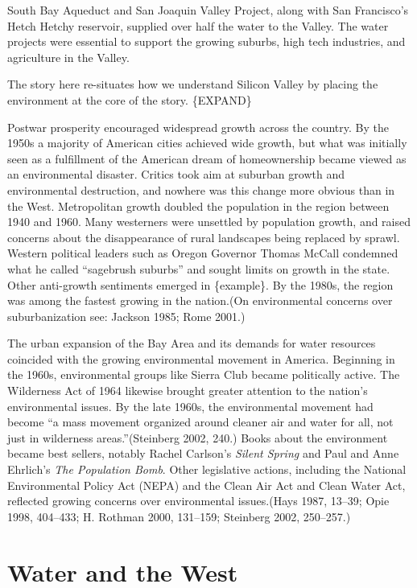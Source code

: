 \documentclass[11pt,article,oneside]{memoir}
\begin{document}
South Bay Aqueduct and San Joaquin Valley Project, along with San
Francisco's Hetch Hetchy reservoir, supplied over half the water to the
Valley. The water projects were essential to support the growing
suburbs, high tech industries, and agriculture in the Valley.

The story here re-situates how we understand Silicon Valley by placing
the environment at the core of the story. \{EXPAND\}

Postwar prosperity encouraged widespread growth across the country. By
the 1950s a majority of American cities achieved wide growth, but what
was initially seen as a fulfillment of the American dream of
homeownership became viewed as an environmental disaster. Critics took
aim at suburban growth and environmental destruction, and nowhere was
this change more obvious than in the West. Metropolitan growth doubled
the population in the region between 1940 and 1960. Many westerners were
unsettled by population growth, and raised concerns about the
disappearance of rural landscapes being replaced by sprawl. Western
political leaders such as Oregon Governor Thomas McCall condemned what
he called ``sagebrush suburbs'' and sought limits on growth in the
state. Other anti-growth sentiments emerged in \{example\}. By the
1980s, the region was among the fastest growing in the nation.(On
environmental concerns over suburbanization see: Jackson 1985; Rome
2001.)

The urban expansion of the Bay Area and its demands for water resources
coincided with the growing environmental movement in America. Beginning
in the 1960s, environmental groups like Sierra Club became politically
active. The Wilderness Act of 1964 likewise brought greater attention to
the nation's environmental issues. By the late 1960s, the environmental
movement had become ``a mass movement organized around cleaner air and
water for all, not just in wilderness areas.''(Steinberg 2002, 240.)
Books about the environment became best sellers, notably Rachel
Carlson's \emph{Silent Spring} and Paul and Anne Ehrlich's \emph{The
Population Bomb}. Other legislative actions, including the National
Environmental Policy Act (NEPA) and the Clean Air Act and Clean Water
Act, reflected growing concerns over environmental issues.(Hays 1987,
13--39; Opie 1998, 404--433; H. Rothman 2000, 131--159; Steinberg 2002,
250--257.)

\section{Water and the West}
\end{document}
